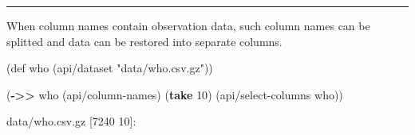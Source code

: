 \documentclass[]{article}
\newenvironment{Shaded}{\begin{snugshade}}{\end{snugshade}}
\newcommand{\KeywordTok}[1]{\textcolor[rgb]{0.13,0.29,0.53}{\textbf{#1}}}
\newcommand{\DecValTok}[1]{\textcolor[rgb]{0.00,0.00,0.81}{#1}}
\newcommand{\StringTok}[1]{\textcolor[rgb]{0.31,0.60,0.02}{#1}}
\newcommand{\FunctionTok}[1]{\textcolor[rgb]{0.00,0.00,0.00}{#1}}
\newcommand{\BuiltInTok}[1]{#1}
\newcommand{\NormalTok}[1]{#1}
\begin{document}
\begin{center}\rule{0.5\linewidth}{0.5pt}\end{center}

When column names contain observation data, such column names can be
splitted and data can be restored into separate columns.

\begin{Shaded}
\begin{Highlighting}[]
\NormalTok{(}\BuiltInTok{def}\FunctionTok{ who }\NormalTok{(api/dataset }\StringTok{"data/who.csv.gz"}\NormalTok{))}
\end{Highlighting}
\end{Shaded}

\begin{Shaded}
\begin{Highlighting}[]
\NormalTok{(}\KeywordTok{->>}\NormalTok{ who}
\NormalTok{     (api/column-names)}
\NormalTok{     (}\KeywordTok{take} \DecValTok{10}\NormalTok{)}
\NormalTok{     (api/select-columns who))}
\end{Highlighting}
\end{Shaded}

data/who.csv.gz {[}7240 10{]}:
\end{document}
